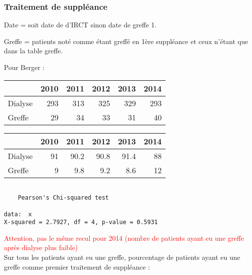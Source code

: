 \documentclass[11pt,a4paper]{article}\usepackage[]{graphicx}\usepackage[]{color}
\makeatletter
\newenvironment{kframe}{%
 \def\at@end@of@kframe{}%
 \ifinner\ifhmode%
  \def\at@end@of@kframe{\end{minipage}}%
  \begin{minipage}{\columnwidth}%
 \fi\fi%
 \def\FrameCommand##1{\hskip\@totalleftmargin \hskip-\fboxsep
 \colorbox{shadecolor}{##1}\hskip-\fboxsep
     \hskip-\linewidth \hskip-\@totalleftmargin \hskip\columnwidth}%
 \MakeFramed {\advance\hsize-\width
   \@totalleftmargin\z@ \linewidth\hsize
   \@setminipage}}%
 {\par\unskip\endMakeFramed%
 \at@end@of@kframe}
\newenvironment{knitrout}{}{} %
\makeatother
\begin{document}
    \subsubsection{Traitement de suppléance}

Date = soit date de d'IRCT sinon date de greffe 1. 

Greffe = patients noté comme étant greffé en 1ère suppléance et ceux n'étant que dans la table greffe.

Pour Berger :

\begin{table}[H]
\centering
\begin{tabular}{lrrrrr}
  \hline
 & 2010 & 2011 & 2012 & 2013 & 2014 \\ 
  \hline
Dialyse & 293 & 313 & 325 & 329 & 293 \\ 
  Greffe & 29 & 34 & 33 & 31 & 40 \\ 
   \hline
\end{tabular}
\end{table}
\begin{table}[H]
\centering
\begin{tabular}{lrrrrr}
  \hline
 & 2010 & 2011 & 2012 & 2013 & 2014 \\ 
  \hline
Dialyse & 91 & 90.2 & 90.8 & 91.4 & 88 \\ 
  Greffe & 9 & 9.8 & 9.2 & 8.6 & 12 \\ 
   \hline
\end{tabular}
\end{table}


\begin{knitrout}
\color{fgcolor}\begin{kframe}
\begin{verbatim}

	Pearson's Chi-squared test

data:  x
X-squared = 2.7927, df = 4, p-value = 0.5931
\end{verbatim}
\end{kframe}
\end{knitrout}

\textcolor{red}{Attention, pas le même recul pour 2014 (nombre de patients ayant eu une greffe après dialyse plus faible)}
~\\

Sur tous les patients ayant eu une greffe, pourcentage de patients ayant eu une greffe comme premier traitement de suppléance :
\end{document}
